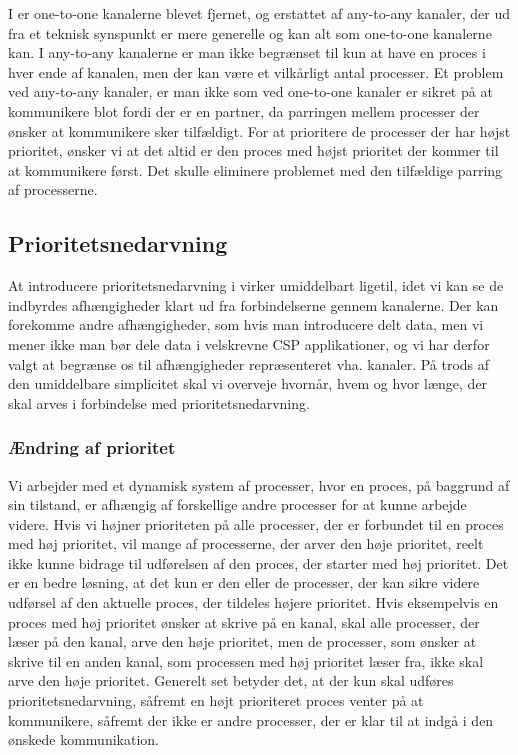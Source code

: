 I \pycsp er one-to-one kanalerne blevet fjernet, og erstattet af any-to-any kanaler, der ud fra et teknisk synspunkt er mere generelle og kan alt som one-to-one kanalerne kan. I any-to-any kanalerne er man ikke begrænset til kun at have en proces i hver ende af kanalen, men der kan være et vilkårligt antal processer. 
Et problem ved  any-to-any kanaler, er man ikke som ved one-to-one kanaler er sikret på at kommunikere blot fordi der er en partner, da parringen mellem processer der ønsker at kommunikere sker tilfældigt. For at prioritere de processer der har højst prioritet, ønsker vi at det altid er den proces med højst prioritet der kommer til at kommunikere først. Det skulle eliminere problemet med den tilfældige parring af processerne. 


\subsection{Prioritetsnedarvning}\label{sec:rtp-pycsp-nedarvning}
At introducere prioritetsnedarvning i \pycsp virker umiddelbart ligetil, idet vi kan se de indbyrdes afhængigheder klart ud fra forbindelserne gennem kanalerne. Der kan forekomme andre afhængigheder, som hvis man introducere delt data, men vi mener ikke man bør dele data i velskrevne CSP applikationer, og vi har derfor valgt at begrænse os til afhængigheder repræsenteret vha. kanaler. På trods af den umiddelbare simplicitet skal vi overveje hvornår, hvem og hvor længe, der skal arves i forbindelse med prioritetsnedarvning.

\subsubsection{Ændring af prioritet}
\label{sec:aendring-af-prioritet}
Vi arbejder med et dynamisk system af processer, hvor en proces, på baggrund af sin tilstand, er afhængig af forskellige andre processer for at kunne arbejde videre. 
Hvis vi højner prioriteten på alle processer, der er forbundet til en proces med høj prioritet, vil mange af processerne, der arver den høje prioritet, reelt ikke kunne bidrage til udførelsen af den proces, der starter med høj prioritet. Det er en bedre løsning, at det kun er den eller de processer, der kan sikre videre udførsel af den aktuelle proces, der tildeles højere prioritet. Hvis eksempelvis en proces med høj prioritet ønsker at skrive på en kanal, skal alle processer, der læser på den kanal, arve den høje prioritet, men de processer, som ønsker at skrive til en anden kanal, som processen med høj prioritet læser fra, ikke skal arve den høje prioritet. Generelt set betyder det, at der kun skal udføres prioritetsnedarvning, såfremt en højt prioriteret proces venter på at kommunikere, såfremt der ikke er andre processer, der er klar til at indgå i den ønskede kommunikation. 

